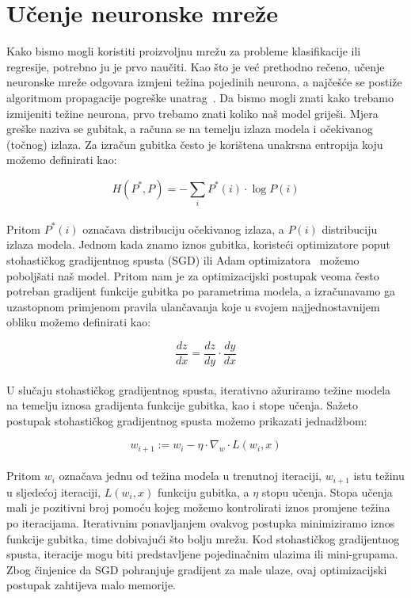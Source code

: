 \documentclass[times, utf8, zavrsni, numeric]{fer}
\begin{document}
\section{Učenje neuronske mreže}
Kako bismo mogli koristiti proizvoljnu mrežu za probleme klasifikacije ili regresije, potrebno ju je prvo naučiti. 
Kao što je već prethodno rečeno, učenje neuronske mreže odgovara izmjeni težina pojedinih neurona, a najčešće se postiže algoritmom propagacije pogreške unatrag~\cite{Goodfellow-et-al-2016}.
Da bismo mogli znati kako trebamo izmijeniti težine neurona, prvo trebamo znati koliko naš model griješi. Mjera greške naziva se gubitak, a računa se na temelju izlaza modela i očekivanog (točnog) izlaza.
Za izračun gubitka često je korištena unakrsna entropija koju možemo definirati kao:

\begin{equation}
    H(P^{*},P) = -\sum_{i}P^{*}(i) \cdot \log{P(i)}
    \label{eq:cross_entropy}
\end{equation}
\\
Pritom $P^{*}(i)$ označava distribuciju očekivanog izlaza, a $P(i)$ distribuciju izlaza modela.
Jednom kada znamo iznos gubitka, koristeći optimizatore poput stohastičkog gradijentnog spusta (SGD) ili Adam optimizatora~\cite{kingma2014adam} možemo poboljšati naš model. 
Pritom nam je za optimizacijski postupak veoma često potreban gradijent funkcije gubitka po parametrima modela, a izračunavamo ga uzastopnom primjenom pravila ulančavanja koje u svojem najjednostavnijem obliku možemo definirati kao:

\begin{equation}
    \frac{dz}{dx} = \frac{dz}{dy} \cdot \frac{dy}{dx}
    \label{eq:chain_rule}
\end{equation}
\\
U slučaju stohastičkog gradijentnog spusta, iterativno ažuriramo težine modela na temelju iznosa gradijenta funkcije gubitka, kao i stope učenja. Sažeto postupak stohastičkog gradijentnog spusta možemo prikazati jednadžbom:

\begin{equation}
    w_{i+1} := w_{i} - \eta \cdot \nabla_{w} \cdot L(w_{i}, x)
    \label{eq:sgd}
\end{equation}
\\
Pritom $w_{i}$ označava jednu od težina modela u trenutnoj iteraciji, $w_{i+1}$ istu težinu u sljedećoj iteraciji, $L(w_{i}, x)$ funkciju gubitka, a $\eta$ stopu učenja. 
Stopa učenja mali je pozitivni broj pomoću kojeg možemo kontrolirati iznos promjene težina po iteracijama. Iterativnim ponavljanjem ovakvog postupka minimiziramo iznos funkcije gubitka, time dobivajući što bolju mrežu.
Kod stohastičkog gradijentnog spusta, iteracije mogu biti predstavljene pojedinačnim ulazima ili mini-grupama. Zbog činjenice da SGD pohranjuje gradijent za male ulaze, ovaj optimizacijski postupak zahtijeva malo memorije.
\end{document}
